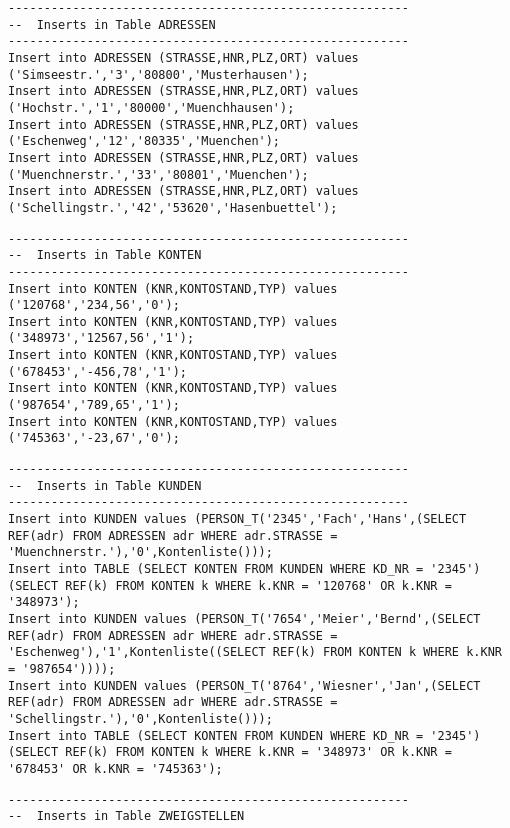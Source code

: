 \documentclass{scrartcl}
\begin{document}
\begin{landscape}
\begin{lstlisting}
--------------------------------------------------------
--  Inserts in Table ADRESSEN
--------------------------------------------------------
Insert into ADRESSEN (STRASSE,HNR,PLZ,ORT) values ('Simseestr.','3','80800','Musterhausen');
Insert into ADRESSEN (STRASSE,HNR,PLZ,ORT) values ('Hochstr.','1','80000','Muenchhausen');
Insert into ADRESSEN (STRASSE,HNR,PLZ,ORT) values ('Eschenweg','12','80335','Muenchen');
Insert into ADRESSEN (STRASSE,HNR,PLZ,ORT) values ('Muenchnerstr.','33','80801','Muenchen');
Insert into ADRESSEN (STRASSE,HNR,PLZ,ORT) values ('Schellingstr.','42','53620','Hasenbuettel');
\end{lstlisting}
\begin{lstlisting}
--------------------------------------------------------
--  Inserts in Table KONTEN
--------------------------------------------------------
Insert into KONTEN (KNR,KONTOSTAND,TYP) values ('120768','234,56','0');
Insert into KONTEN (KNR,KONTOSTAND,TYP) values ('348973','12567,56','1');
Insert into KONTEN (KNR,KONTOSTAND,TYP) values ('678453','-456,78','1');
Insert into KONTEN (KNR,KONTOSTAND,TYP) values ('987654','789,65','1');
Insert into KONTEN (KNR,KONTOSTAND,TYP) values ('745363','-23,67','0');
\end{lstlisting}
\begin{lstlisting}
--------------------------------------------------------
--  Inserts in Table KUNDEN
--------------------------------------------------------
Insert into KUNDEN values (PERSON_T('2345','Fach','Hans',(SELECT REF(adr) FROM ADRESSEN adr WHERE adr.STRASSE = 'Muenchnerstr.'),'0',Kontenliste()));
Insert into TABLE (SELECT KONTEN FROM KUNDEN WHERE KD_NR = '2345')(SELECT REF(k) FROM KONTEN k WHERE k.KNR = '120768' OR k.KNR = '348973');
Insert into KUNDEN values (PERSON_T('7654','Meier','Bernd',(SELECT REF(adr) FROM ADRESSEN adr WHERE adr.STRASSE = 'Eschenweg'),'1',Kontenliste((SELECT REF(k) FROM KONTEN k WHERE k.KNR = '987654'))));
Insert into KUNDEN values (PERSON_T('8764','Wiesner','Jan',(SELECT REF(adr) FROM ADRESSEN adr WHERE adr.STRASSE = 'Schellingstr.'),'0',Kontenliste()));
Insert into TABLE (SELECT KONTEN FROM KUNDEN WHERE KD_NR = '2345')(SELECT REF(k) FROM KONTEN k WHERE k.KNR = '348973' OR k.KNR = '678453' OR k.KNR = '745363');
\end{lstlisting}
\begin{lstlisting}
--------------------------------------------------------
--  Inserts in Table ZWEIGSTELLEN

\end{lstlisting}
\end{landscape}
\end{document}
